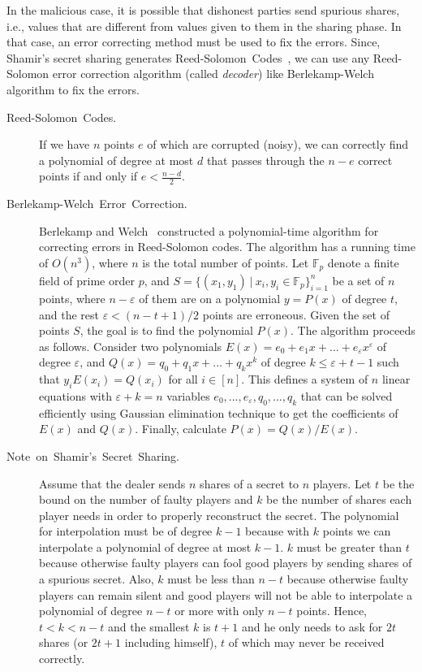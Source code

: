 \documentclass[11pt]{article}
\theoremstyle{plain}
\begin{document}
In the malicious case, it is possible that dishonest parties send
spurious shares, i.e., values that are different from values given
to them in the sharing phase. In that case, an error correcting method
must be used to fix the errors. Since, Shamir's secret sharing generates
Reed-Solomon~Codes~\cite{Reed-Solomon1960}, we can use any Reed-Solomon
error correction algorithm (called \emph{decoder}) like Berlekamp-Welch
algorithm to fix the errors.
\begin{description}
	\item [{Reed-Solomon~Codes.}] If we have $n$ points $e$ of which are
	corrupted (noisy), we can correctly find a polynomial of degree at
	most $d$ that passes through the $n-e$ correct points if and only
	if $e<\frac{n-d}{2}$.
	\item [{Berlekamp-Welch~Error~Correction.}] \noindent Berlekamp and Welch~\cite{Berlekamp:Welch:1986}
	constructed a polynomial-time algorithm for correcting errors in Reed-Solomon
	codes. The algorithm has a running time of $O(n^{3})$, where $n$
	is the total number of points. Let $\mathbb{F}_{p}$ denote a finite
	field of prime order $p$, and $S=\{(x_{1},y_{1})\:|\:x_{i},y_{i}\in\mathbb{F}_{p}\}_{i=1}^{n}$
	be a set of $n$ points, where $n-\varepsilon$ of them are on a polynomial
	$y=P(x)$ of degree $t$, and the rest $\varepsilon<(n-t+1)/2$ points
	are erroneous. Given the set of points $S$, the goal is to find the
	polynomial $P(x)$. The algorithm proceeds as follows. Consider two
	polynomials $E(x)=e_{0}+e_{1}x+...+e_{\varepsilon}x^{\varepsilon}$
	of degree $\varepsilon$, and $Q(x)=q_{0}+q_{1}x+...+q_{k}x^{k}$
	of degree $k\leq\varepsilon+t-1$ such that $y_{i}E(x_{i})=Q(x_{i})$
	for all $i\in[n]$. This defines a system of $n$ linear equations
	with $\varepsilon+k=n$ variables $e_{0},...,e_{\varepsilon},q_{0},...,q_{k}$
	that can be solved efficiently using Gaussian elimination technique
	to get the coefficients of $E(x)$ and $Q(x)$. Finally, calculate
	$P(x)=Q(x)/E(x)$.
	\item [{Note~on~Shamir's~Secret~Sharing.}] Assume that the dealer sends
	$n$ shares of a secret to $n$ players. Let $t$ be the bound on
	the number of faulty players and $k$ be the number of shares each
	player needs in order to properly reconstruct the secret. The polynomial
	for interpolation must be of degree $k-1$ because with $k$ points
	we can interpolate a polynomial of degree at most $k-1$. $k$ must
	be greater than $t$ because otherwise faulty players can fool good
	players by sending shares of a spurious secret. Also, $k$ must be
	less than $n-t$ because otherwise faulty players can remain silent
	and good players will not be able to interpolate a polynomial of degree
	$n-t$ or more with only $n-t$ points. Hence, $t<k<n-t$ and the
	smallest $k$ is $t+1$ and he only needs to ask for $2t$ shares
	(or $2t+1$ including himself), $t$ of which may never be received
	correctly.
\end{description}
\end{document}
